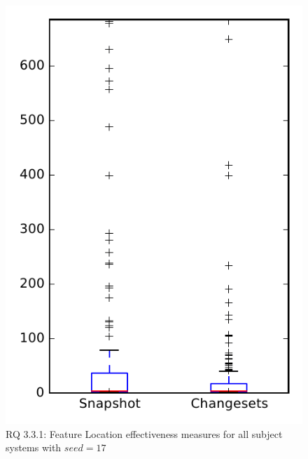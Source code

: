 
\begin{figure}
\centering
\includegraphics[height=0.4\textheight]{figures/flt_seed/rq1_overview_17}
\caption{RQ 3.3.1: Feature Location effectiveness measures for all subject systems with $seed=17$}
\label{fig:flt_seed:rq1:overview}
\end{figure}
